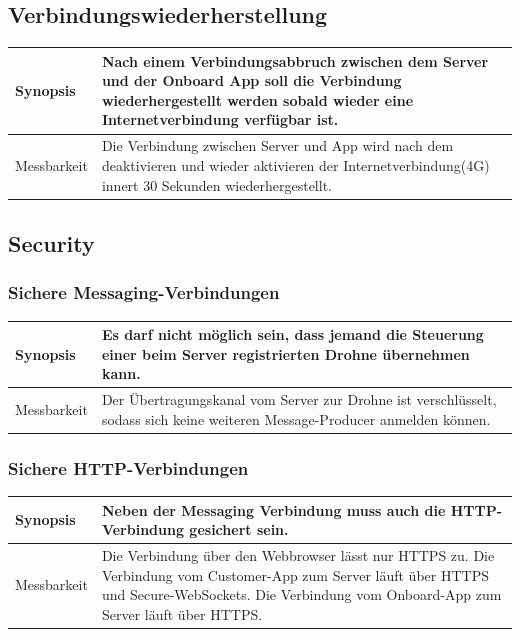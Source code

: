 \subsection{Verbindungswiederherstellung}
\begin{tabular}{|p{}|p{}|} \hline
	Synopsis & Nach einem Verbindungsabbruch zwischen dem Server und der Onboard App soll die Verbindung wiederhergestellt werden sobald wieder eine Internetverbindung verfügbar ist. \\ \hline
	
	Messbarkeit & Die Verbindung zwischen Server und App wird nach dem deaktivieren und wieder aktivieren der Internetverbindung(4G) innert 30 Sekunden wiederhergestellt.\\ \hline
\end{tabular}

\subsection{Security}
\subsubsection{Sichere Messaging-Verbindungen}
\label{sec:message-security}
\begin{tabular}{|p{}|p{}|} \hline
	Synopsis & Es darf nicht möglich sein, dass jemand die Steuerung einer beim Server registrierten Drohne übernehmen kann.\\ \hline
	Messbarkeit & Der Übertragungskanal vom Server zur Drohne ist verschlüsselt, sodass sich keine weiteren \Gls{Message-Producer} anmelden können.\\ \hline
\end{tabular}

\subsubsection{Sichere HTTP-Verbindungen}
\begin{tabular}{|p{}|p{}|} \hline
	Synopsis & Neben der Messaging Verbindung muss auch die HTTP-Verbindung gesichert sein.\\ \hline
	Messbarkeit & Die Verbindung über den Webbrowser lässt nur HTTPS zu. Die Verbindung vom Customer-App zum Server läuft über HTTPS und Secure-WebSockets. Die Verbindung vom Onboard-App zum Server läuft über HTTPS.\\ \hline
\end{tabular}


